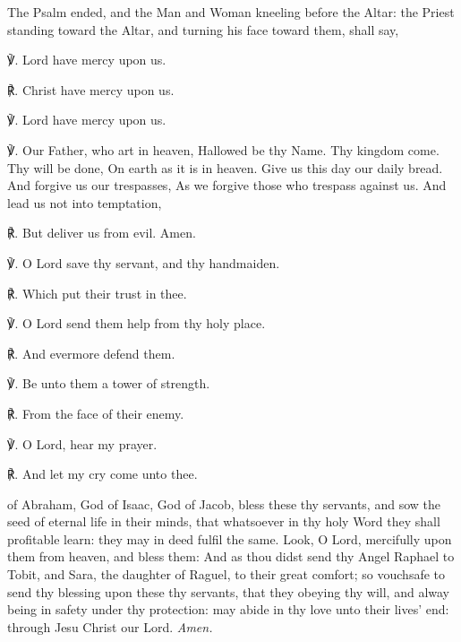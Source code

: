 \clearpage
\begin{rubric}
	The Psalm ended, and the Man and Woman kneeling before the Altar: the Priest standing toward the Altar, and turning his face toward them, shall say,
\end{rubric}
℣. Lord have mercy upon us.\par
℟. Christ have mercy upon us.\par
℣. Lord have mercy upon us.\par
℣. Our Father, who art in heaven, Hallowed be thy Name. Thy kingdom come. Thy will be done, On earth as it is in heaven. Give us this day our daily bread. And forgive us our trespasses, As we forgive those who trespass against us. And lead us not into temptation,\par
℟. But deliver us from evil. Amen.\par
℣. O Lord save thy servant, and thy handmaiden.\par
℟. Which put their trust in thee.\par
℣. O Lord send them help from thy holy place.\par
℟. And evermore defend them.\par
℣. Be unto them a tower of strength.\par
℟. From the face of their enemy.\par
℣. O Lord, hear my prayer.\par
℟. And let my cry come unto thee.\par
{}
{} of Abraham, God of Isaac, God of Jacob, bless these thy servants, and sow the seed of eternal life in their minds, that whatsoever in thy holy Word they shall profitable learn: they may in deed fulfil the same. Look, O Lord, mercifully upon them from heaven, and bless them: And as thou didst send thy Angel Raphael to Tobit, and Sara, the daughter of Raguel, to their great comfort; so vouchsafe to send thy blessing upon these thy servants, that they obeying thy will, and alway being in safety under thy protection: may abide in thy love unto their lives' end: through Jesu Christ our Lord. \textit{Amen.}

